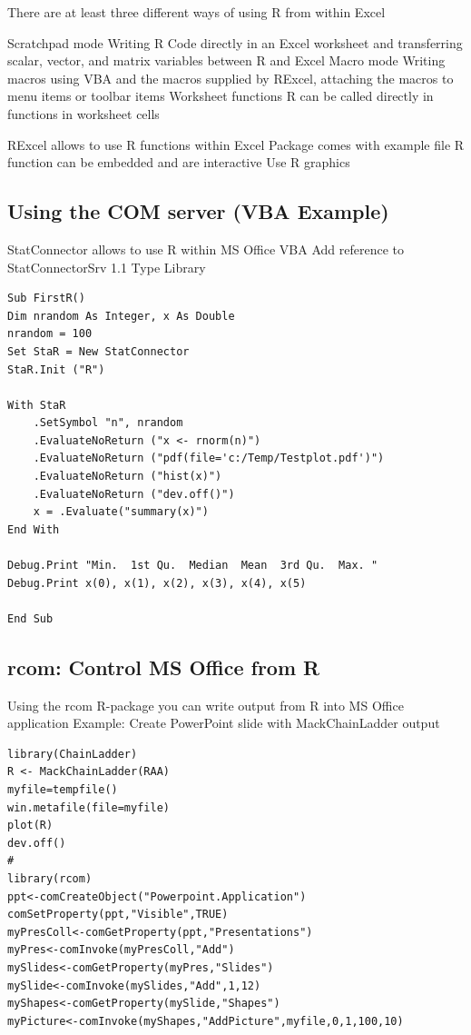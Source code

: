 \documentclass[a4paper]{article}
\begin{document}
There are at least three different ways of using R from within Excel

Scratchpad mode
Writing R Code directly in an Excel worksheet and transferring scalar, vector, and matrix variables between R and Excel
Macro mode
Writing macros using VBA and the macros supplied by RExcel, attaching the macros to menu items or toolbar items
Worksheet functions
R can be called directly in functions in worksheet cells

RExcel allows to use R functions within Excel
Package comes with example file
R function can be embedded and are interactive
Use R graphics

\subsection{Using the COM server (VBA Example)}

StatConnector allows to use R within MS Office VBA
Add reference to StatConnectorSrv 1.1 Type Library
\begin{verbatim}
Sub FirstR()
Dim nrandom As Integer, x As Double
nrandom = 100
Set StaR = New StatConnector
StaR.Init ("R")

With StaR
	.SetSymbol "n", nrandom
	.EvaluateNoReturn ("x <- rnorm(n)")
	.EvaluateNoReturn ("pdf(file='c:/Temp/Testplot.pdf')")
	.EvaluateNoReturn ("hist(x)")
	.EvaluateNoReturn ("dev.off()")
	x = .Evaluate("summary(x)")
End With

Debug.Print "Min.  1st Qu.  Median  Mean  3rd Qu.  Max. "
Debug.Print x(0), x(1), x(2), x(3), x(4), x(5)

End Sub
\end{verbatim}


\subsection{rcom: Control MS Office from R}
Using the rcom R-package you can write output from R into MS Office application
Example: Create PowerPoint slide with MackChainLadder output

\begin{verbatim}
library(ChainLadder)
R <- MackChainLadder(RAA)
myfile=tempfile()
win.metafile(file=myfile)
plot(R)
dev.off()
#
library(rcom)
ppt<-comCreateObject("Powerpoint.Application")
comSetProperty(ppt,"Visible",TRUE)
myPresColl<-comGetProperty(ppt,"Presentations")
myPres<-comInvoke(myPresColl,"Add")
mySlides<-comGetProperty(myPres,"Slides")
mySlide<-comInvoke(mySlides,"Add",1,12)
myShapes<-comGetProperty(mySlide,"Shapes")
myPicture<-comInvoke(myShapes,"AddPicture",myfile,0,1,100,10)
\end{verbatim}
\end{document}
